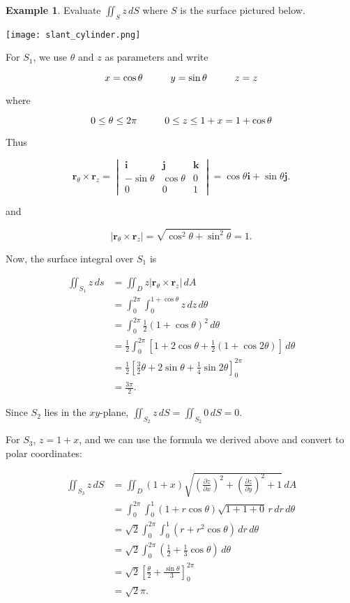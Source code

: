 \documentclass[11pt,oneside,english]{amsart}
\theoremstyle{definition}
\newtheorem*{example}{Example}
\newcommand{\pspace}{\hspace{10mm}}
\newcommand{\pp}[2]{\frac{\partial{#1}}{\partial{#2}}}
\begin{document}
\pagebreak

\begin{example}
Evaluate $\iint_Sz\,dS$ where $S$ is the surface pictured below.

\begin{center}
\texttt{[image: slant\_cylinder.png]}
\end{center}

For $S_1$, we use $\theta$ and $z$ as parameters and write 

\[
x=\cos\theta\pspace y=\sin\theta\pspace z=z
\]

where 

\[
0\leq\theta \leq 2\pi\pspace 0\leq z\leq 1+x=1+\cos\theta
\]

Thus

\[
\mathbf{r}_\theta\times\mathbf{r}_z=\begin{vmatrix}\mathbf{i}&\mathbf{j}&\mathbf{k}\\ -\sin\theta & \cos\theta & 0\\ 0 & 0 & 1\end{vmatrix}=\cos\theta\mathbf{i}+\sin\theta\mathbf{j}.
\]

and

\[
|\mathbf{r}_\theta\times\mathbf{r}_z|=\sqrt{\cos^2\theta+\sin^2\theta}=1.
\]

Now, the surface integral over $S_1$ is

\begin{align*}
\iint_{S_1}z\,ds&=\iint_Dz|\mathbf{r}_\theta\times\mathbf{r}_z|\,dA\\[2mm]
&=\int_0^{2\pi}\int_0^{1+\cos\theta}z\,dz\,d\theta\\[2mm]
&=\int_0^{2\pi}\frac{1}{2}(1+\cos\theta)^2\,d\theta\\[2mm]
&=\frac{1}{2}\int_0^{2\pi}\left[1+2\cos\theta+\frac{1}{2}(1+\cos2\theta)\right]\,d\theta\\[2mm]
&=\frac{1}{2}\left[\frac{3}{2}\theta+2\sin\theta+\frac{1}{4}\sin2\theta\right]_0^{2\pi}\\[2mm]
&=\frac{3\pi}{2}.
\end{align*}

Since $S_2$ lies in the $xy$-plane, $\displaystyle \iint_{S_2}z\,dS=\iint_{S_2}0\,dS=0$.

For $S_3$, $z=1+x$, and we can use the formula we derived above and convert to polar coordinates:

\begin{align*}
\iint_{S_3}z\,dS&=\iint_D(1+x)\sqrt{\left(\pp{z}{x}\right)^2+\left(\pp{z}{y}\right)^2+1}\,dA\\[2mm]
&=\int_0^{2\pi}\int_0^1(1+r\cos\theta)\sqrt{1+1+0}\,r\,dr\,d\theta\\[2mm]
&=\sqrt{2}\int_0^{2\pi}\int_0^1(r+r^2\cos\theta)\,dr\,d\theta\\[2mm]
&=\sqrt{2}\int_0^{2\pi}\left(\frac{1}{2}+\frac{1}{3}\cos\theta\right)\,d\theta\\[2mm]
&=\sqrt{2}\left[\frac{\theta}{2}+\frac{\sin\theta}{3}\right]_0^{2\pi}\\[2mm]
&=\sqrt{2}\pi.
\end{align*}


\end{example}
\end{document}
